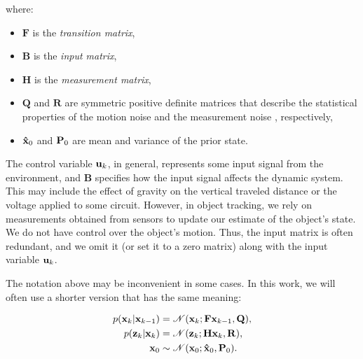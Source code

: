 \noindent where:

\begin{itemize}
    \item $\mathbf{F}$ is the \textit{transition matrix},
    \item $\mathbf{B}$ is the \textit{input matrix},
    \item $\mathbf{H}$ is the \textit{measurement matrix},
    \item $\mathbf{Q}$ and $\mathbf{R}$ are symmetric positive definite matrices
        that describe the statistical properties of the motion noise
         and the measurement noise , respectively,
    \item $\vecat{\hat x}{0}$ and $\vecat{P}{0}$ are mean and variance of the 
    prior state.
\end{itemize}

The control variable $\vecat{u}{k}$, in general, represents some input signal from the environment, and $\mathbf{B}$ specifies how the input signal affects the dynamic system. This may include the effect of gravity on the vertical traveled distance or the voltage applied to some circuit. However, in object tracking, we rely on measurements obtained from sensors to update our estimate of the object's state. We do not have control over the object's motion. Thus, the input matrix is often redundant, and we omit it (or set it to a zero matrix) along with the input variable $\vecat{u}{k}$.

The notation above may be inconvenient in some cases. In this work, we will often use a shorter version that has the same meaning:

\begin{align}
    p(\vecat{x}{k} | \vecat{x}{k-1})
        &= \mathscr{N}(\vecat{x}{k}; \mathbf{F}\vecat{x}{k-1}, \mathbf{Q}), 
        \label{eq:motion-model} \\
    p(\vecat{z}{k} | \vecat{x}{k})
        &= \mathscr{N}(\vecat{z}{k}; \mathbf{H}\vecat{x}{k}, \mathbf{R}), 
        \label{eq:measurement-model} \\
    \vecat{x}{0}
        &\sim \mathscr{N}(\vecat{x}{0}; \vecat{\hat{x}}{0}, \vecat{P}{0}).
        \label{eq:prior-x0}
\end{align}
